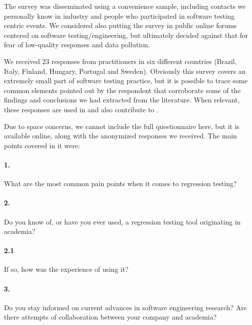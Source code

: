 The survey was disseminated using a convenience sample, including contacts we personally know in industry and people who participated in software testing centric events.
We considered also putting the survey in public online forums centered on software testing/engineering, but ultimately decided against that for fear of low-quality responses and data pollution.

We received 23 responses from practitioners in six different countries (Brazil, Italy, Finland, Hungary, Portugal and Sweden). 
Obviously this survey covers an extremely small part of software testing practice, but it is possible to trace some common elements pointed out by the respondent that corroborate some of the findings and conclusions we had extracted from the literature.
When relevant, these responses are used in  and also contribute to .

Due to space concerns, we cannot include the full questionnaire here, but it is available online, along with the anonymized responses we received.
The main points covered in it were:
\begin{tcolorbox}%
\small
\paragraph{1.} What are the most common pain points when it comes to regression testing?
	
\paragraph{2.} Do you know of, or have you ever used, a regression testing tool originating in academia?

\paragraph{2.1} If so, how was the experience of using it?
	
\paragraph{3.} Do you stay informed on current advances in software engineering research? Are there attempts of collaboration between your company and academia?
	
\end{tcolorbox}

